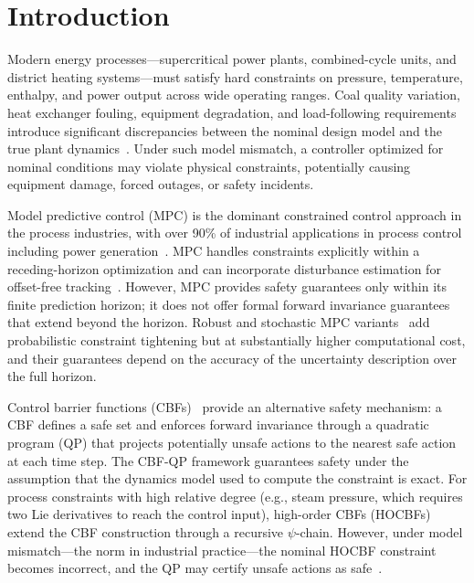\section{Introduction}
\label{sec:intro}

Modern energy processes---supercritical power plants, combined-cycle units, and district heating systems---must satisfy hard constraints on pressure, temperature, enthalpy, and power output across wide operating ranges. Coal quality variation, heat exchanger fouling, equipment degradation, and load-following requirements introduce significant discrepancies between the nominal design model and the true plant dynamics~\cite{astrom2000boiler,tan2006supercritical}. Under such model mismatch, a controller optimized for nominal conditions may violate physical constraints, potentially causing equipment damage, forced outages, or safety incidents.

Model predictive control (MPC) is the dominant constrained control approach in the process industries, with over 90\% of industrial applications in process control including power generation~\cite{qin2003survey,mayne2000constrained}. MPC handles constraints explicitly within a receding-horizon optimization and can incorporate disturbance estimation for offset-free tracking~\cite{morari1999model}. However, MPC provides safety guarantees only within its finite prediction horizon; it does not offer formal forward invariance guarantees that extend beyond the horizon. Robust and stochastic MPC variants~\cite{hewing2020cautious} add probabilistic constraint tightening but at substantially higher computational cost, and their guarantees depend on the accuracy of the uncertainty description over the full horizon.

Control barrier functions (CBFs)~\cite{ames2017cbf} provide an alternative safety mechanism: a CBF defines a safe set and enforces forward invariance through a quadratic program (QP) that projects potentially unsafe actions to the nearest safe action at each time step. The CBF-QP framework guarantees safety under the assumption that the dynamics model used to compute the constraint is exact. For process constraints with high relative degree (e.g., steam pressure, which requires two Lie derivatives to reach the control input), high-order CBFs (HOCBFs)~\cite{xiao2021hocbf} extend the CBF construction through a recursive $\psi$-chain. However, under model mismatch---the norm in industrial practice---the nominal HOCBF constraint becomes incorrect, and the QP may certify unsafe actions as safe~\cite{taylor2020issf}.

